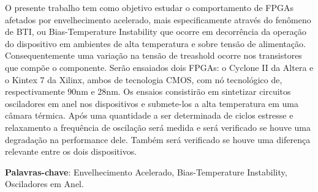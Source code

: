 %	
%   
%	
	
	
	
	
  

    



\begin{resumo}[Resumo]
O presente trabalho tem como objetivo estudar o comportamento de FPGAs afetados por envelhecimento acelerado, mais especificamente através do fenômeno de BTI, ou Bias-Temperature Instability que ocorre em decorrência da operação do dispositivo em ambientes de alta temperatura e sobre tensão de alimentação. Consequentemente uma variação na tensão de treashold ocorre nos transistores que compõe o componente. Serão ensaiados dois FPGAs: o Cyclone II da Altera e o Kintex 7 da Xilinx, ambos de tecnologia CMOS, com nó tecnológico de, respectivamente 90nm e 28nm. Os ensaios consistirão em sintetizar circuitos osciladores em anel nos dispositivos e submete-los a alta temperatura em uma câmara térmica. Após uma quantidade a ser determinada de ciclos estresse e relaxamento a frequência de oscilação será medida e será verificado se houve uma degradação na performance dele. Também será verificado se houve uma diferença relevante entre os dois dispositivos.

    \vspace{\onelineskip}
	\noindent
        
	\textbf{Palavras-chave}: Envelhecimento Acelerado, Bias-Temperature Instability, Osciladores em Anel.

\end{resumo}


